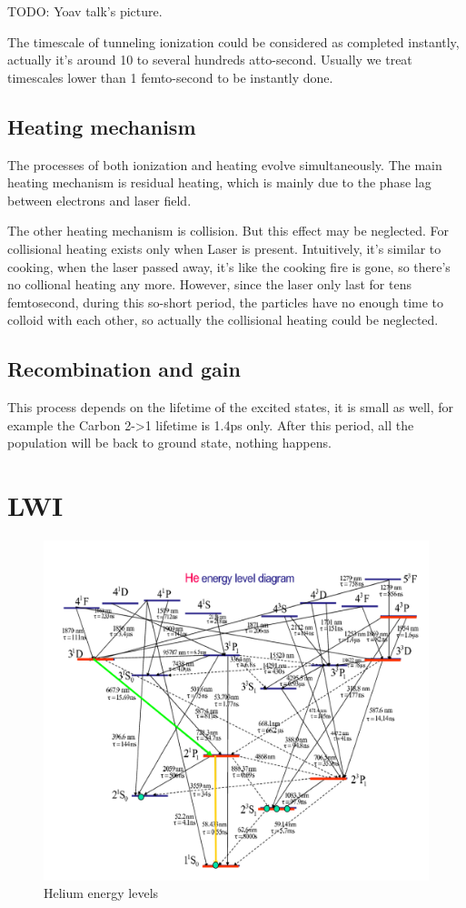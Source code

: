 TODO: Yoav talk's picture.

The timescale of tunneling ionization could be considered as completed
instantly, actually it's around 10 to several hundreds
atto-second. Usually we treat timescales lower than 1 femto-second to
be instantly done.

\subsection{Heating mechanism}
The processes of both ionization and heating evolve
simultaneously. The main heating mechanism is residual heating, which
is mainly due to the phase lag between electrons and laser field.

The other heating mechanism is collision. But this effect may be neglected.
For collisional heating exists only when Laser is
present. Intuitively, it's similar to cooking, when the laser passed
away, it's like the cooking fire is gone, so there's no collional
heating any more. However, since the laser only last for tens
femtosecond, during this so-short period, the particles have no enough
time to colloid with each other, so actually the collisional heating
could be neglected.

\subsection{Recombination and gain}
This process depends on the lifetime of the excited states, it is
small as well, for example the Carbon 2->1 lifetime is 1.4ps
only. After this period, all the population will be back to ground
state, nothing happens.

\section{LWI}
\begin{figure}[htb]
  \begin{center}
    \includegraphics[width=0.9\linewidth]{ch-theory/figures/Helium_energy_levels}
    \caption[Sample Title Page Layout]{Helium energy levels~\cite{drake2007multiplet}}
    \label{fig:theory:HeEnergyLevel}
  \end{center}
\end{figure}


